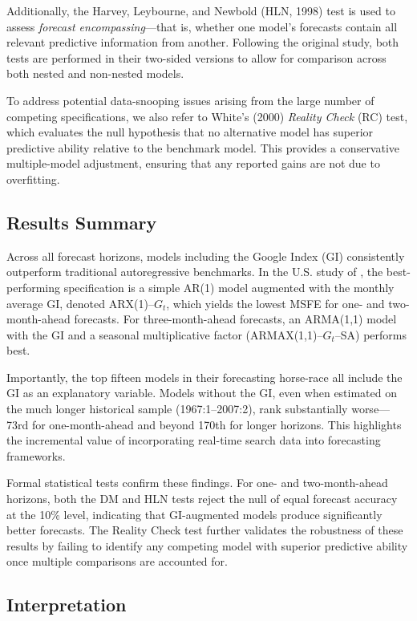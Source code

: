 \documentclass{article}
\begin{document}
Additionally, the Harvey, Leybourne, and Newbold (HLN, 1998) test is used to assess \emph{forecast encompassing}---that is, whether one model’s forecasts contain all relevant predictive information from another. 
Following the original study, both tests are performed in their two-sided versions to allow for comparison across both nested and non-nested models.

To address potential data-snooping issues arising from the large number of competing specifications, we also refer to White’s (2000) \emph{Reality Check} (RC) test, which evaluates the null hypothesis that no alternative model has superior predictive ability relative to the benchmark model. 
This provides a conservative multiple-model adjustment, ensuring that any reported gains are not due to overfitting.

\subsection{Results Summary}

Across all forecast horizons, models including the Google Index (GI) consistently outperform traditional autoregressive benchmarks. 
In the U.S. study of \citet{DamuriMarcucci2009}, the best-performing specification is a simple AR(1) model augmented with the monthly average GI, denoted ARX(1)--$G_t$, which yields the lowest MSFE for one- and two-month-ahead forecasts. 
For three-month-ahead forecasts, an ARMA(1,1) model with the GI and a seasonal multiplicative factor (ARMAX(1,1)--$G_t$--SA) performs best.

Importantly, the top fifteen models in their forecasting horse-race all include the GI as an explanatory variable. 
Models without the GI, even when estimated on the much longer historical sample (1967:1–2007:2), rank substantially worse---73rd for one-month-ahead and beyond 170th for longer horizons. 
This highlights the incremental value of incorporating real-time search data into forecasting frameworks.

Formal statistical tests confirm these findings. 
For one- and two-month-ahead horizons, both the DM and HLN tests reject the null of equal forecast accuracy at the 10\% level, indicating that GI-augmented models produce significantly better forecasts. 
The Reality Check test further validates the robustness of these results by failing to identify any competing model with superior predictive ability once multiple comparisons are accounted for.

\subsection{Interpretation}
\end{document}
